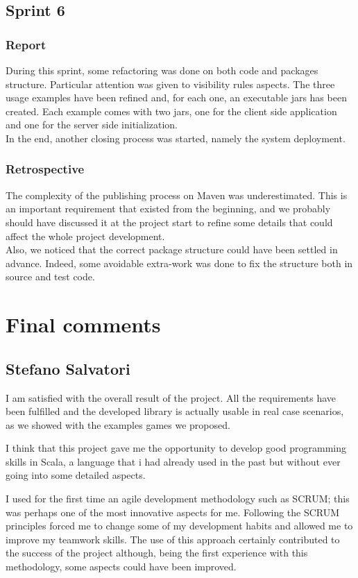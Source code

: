 \subsection{Sprint 6}

\subsubsection{Report}
During this sprint, some refactoring was done on both code and packages structure. Particular attention was given to visibility rules aspects.
The three usage examples have been refined and, for each one, an executable jars has been created. Each example comes with two jars, one for the client side application and one for the server side initialization.
\\
In the end, another closing process was started, namely the system deployment.


\subsubsection{Retrospective}
The complexity of the publishing process on Maven was underestimated.
This is an important requirement that existed from the beginning, and we probably should have discussed it at the project start to refine some details that could affect the whole project development.
\\
Also, we noticed that the correct package structure could have been settled in advance.
Indeed, some avoidable extra-work was done to fix the structure both in source and test code.

\section{Final comments}
\subsection{Stefano Salvatori}
I am satisfied with the overall result of the project.
All the requirements have been fulfilled and the developed library is actually usable in real case scenarios, as we showed with the examples games we proposed.

I think that this project gave me the opportunity to develop good programming skills in Scala, a language that i had already used in the past but without ever going into some detailed aspects.

I used for the first time an agile development methodology such as SCRUM; this was perhaps one of the most innovative aspects for me. Following the SCRUM principles forced me to change some of my development habits and allowed me to improve my teamwork skills.
The use of this approach certainly contributed to the success of the project although, being the first experience with this methodology, some aspects could have been improved.


